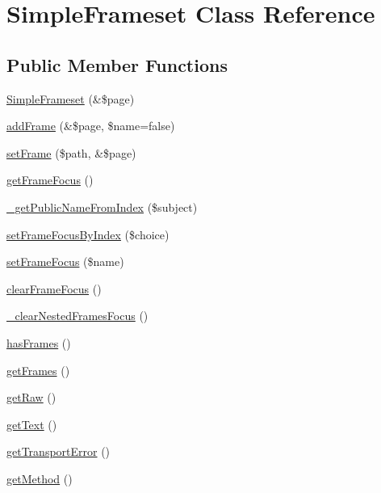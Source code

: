 \hypertarget{class_simple_frameset}{
\section{SimpleFrameset Class Reference}
\label{class_simple_frameset}
}
\subsection*{Public Member Functions}
\begin{DoxyCompactItemize}
\item 
\hyperlink{class_simple_frameset_ac573bfba76183db88c24c6208795e4b9}{SimpleFrameset} (\&\$page)
\item 
\hyperlink{class_simple_frameset_a794b1670aa867190f08ae26e5505a67b}{addFrame} (\&\$page, \$name=false)
\item 
\hyperlink{class_simple_frameset_a70729731514a1be863bef62e5689c029}{setFrame} (\$path, \&\$page)
\item 
\hyperlink{class_simple_frameset_a5f18f98fa0a35bedbc8d218f864b0cc3}{getFrameFocus} ()
\item 
\hyperlink{class_simple_frameset_a9c1ad28fd90f2066cfd5b029a5ea12d5}{\_\-getPublicNameFromIndex} (\$subject)
\item 
\hyperlink{class_simple_frameset_ac461be8fee34bfe59dcfbe12957a9f38}{setFrameFocusByIndex} (\$choice)
\item 
\hyperlink{class_simple_frameset_aa42deea814c0ebac11b76f2bea262966}{setFrameFocus} (\$name)
\item 
\hyperlink{class_simple_frameset_a9965c44c9f258c520e9b73048c09c8fb}{clearFrameFocus} ()
\item 
\hyperlink{class_simple_frameset_a2556cd2c75a765da12e5cd1581f7fc08}{\_\-clearNestedFramesFocus} ()
\item 
\hyperlink{class_simple_frameset_ab83f9c4c135d16c4b9040d7fe0eb2c6f}{hasFrames} ()
\item 
\hyperlink{class_simple_frameset_a144edf4c75dcf8b6511e91ad9afebb6d}{getFrames} ()
\item 
\hyperlink{class_simple_frameset_af34beb82a412aafcbd92be1fed290e07}{getRaw} ()
\item 
\hyperlink{class_simple_frameset_ad0e21fbf4af0fd8b3fe39f565740f69b}{getText} ()
\item 
\hyperlink{class_simple_frameset_abd6d897acb9ced2ca405ba67f2483098}{getTransportError} ()
\item 
\hyperlink{class_simple_frameset_a96a168b9b6dd9d68996a7d818a64df8c}{getMethod} ()

\end{DoxyCompactItemize}
